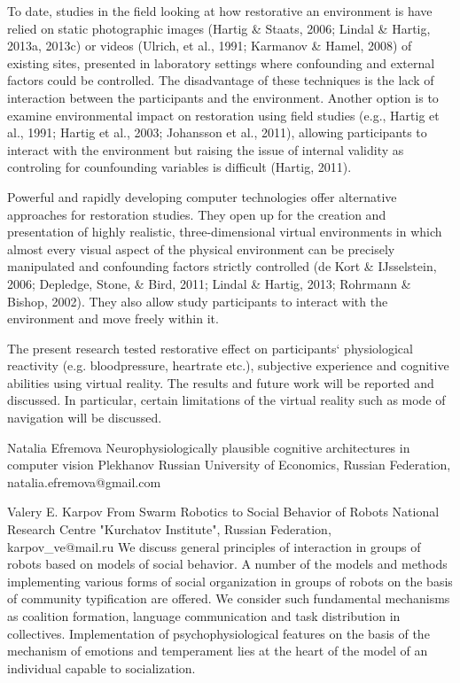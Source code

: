 \documentclass[10pt,fleqn,openany]{book} %
\begin{document}
\begin{enumerate}
{			To date, studies in the field looking at how restorative an environment is have relied on static photographic images (Hartig \& Staats, 2006; Lindal \& Hartig, 2013a, 2013c) or videos (Ulrich, et al., 1991; Karmanov \& Hamel, 2008) of existing sites, presented in laboratory settings where confounding and external factors could be controlled. The disadvantage of these techniques is the lack of interaction between the participants and the environment. Another option is to examine environmental impact on restoration using field studies (e.g., Hartig et al., 1991; Hartig et al., 2003; Johansson et al., 2011), allowing participants to interact with the environment but raising the issue of internal validity as controling for counfounding variables is difficult (Hartig, 2011). 
			
			Powerful and rapidly developing computer technologies offer alternative approaches for restoration studies. They open up for the creation and presentation of highly realistic, three-dimensional virtual environments in which almost every visual aspect of the physical environment can be precisely manipulated and confounding factors strictly controlled (de Kort \& IJsselstein, 2006; Depledge, Stone, \& Bird, 2011; Lindal \& Hartig, 2013; Rohrmann \& Bishop, 2002). They also allow study participants to interact with the environment and move freely within it. 
			
			The present research tested restorative effect on participants‘ physiological reactivity (e.g. bloodpressure, heartrate etc.), subjective experience and cognitive abilities using virtual reality. The results and future work will be reported and discussed. In particular, certain limitations of the virtual reality such as mode of navigation will be discussed.}
		
	\paperabstract
		{Natalia Efremova}
		{Neurophysiologically plausible cognitive architectures in computer vision}	
		{Plekhanov Russian University of Economics, Russian Federation,\\natalia.efremova@gmail.com}
		{}
		
	\paperabstract
		{Valery E. Karpov}
		{From Swarm Robotics to Social Behavior of Robots}
		{National Research Centre "Kurchatov Institute", Russian Federation,\\karpov\_ve@mail.ru}
		{
			We discuss general principles of interaction in groups of robots based on models of social behavior. A number of the models and methods implementing various forms of social organization in groups of robots on the basis of community typification are offered. We consider such fundamental mechanisms as coalition formation, language communication and task distribution in collectives. Implementation of psychophysiological features on the basis of the mechanism of emotions and temperament lies at the heart of the model of an individual capable to socialization.}
		

\end{enumerate}
\end{document}
